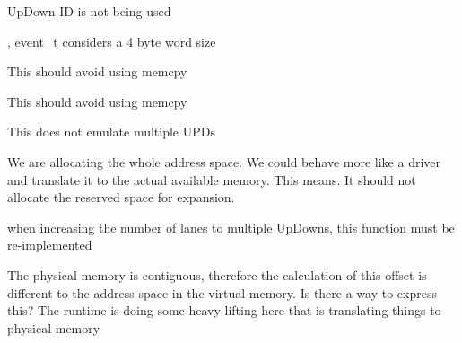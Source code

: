 
\begin{DoxyRefList}
\item[Class \mbox{\hyperlink{class_up_down_1_1event__t}{Up\+Down\+::event\+\_\+t}} ]\label{todo__todo000001}%
%
Up\+Down ID is not being used 



, \mbox{\hyperlink{class_up_down_1_1event__t}{event\+\_\+t}} considers a 4 byte word size  
\item[Member \mbox{\hyperlink{class_up_down_1_1operands__t_ab85237b737f780d3985be56eec5067ff}{Up\+Down\+::operands\+\_\+t\+::operands\+\_\+t}} (uint8\+\_\+t num, ptr\+\_\+t oper, word\+\_\+t cont=0)]\label{todo__todo000002}%
%
This should avoid using memcpy  
\item[Member \mbox{\hyperlink{class_up_down_1_1operands__t_a90604b735bc17d1136cbd32da1292496}{Up\+Down\+::operands\+\_\+t\+::operands\+\_\+t}} (uint8\+\_\+t num, word\+\_\+t cont=0)]\label{todo__todo000003}%
%
This should avoid using memcpy  
\item[Class \mbox{\hyperlink{class_up_down_1_1_sim_u_d_runtime__t}{Up\+Down\+::Sim\+UDRuntime\+\_\+t}} ]\label{todo__todo000006}%
%
This does not emulate multiple UPDs 
\item[Member \mbox{\hyperlink{class_up_down_1_1_sim_u_d_runtime__t_a7113c0fad105b40a81231139332c0061}{Up\+Down\+::Sim\+UDRuntime\+\_\+t\+::init\+Memory\+Arrays}} ()]\label{todo__todo000007}%
%
We are allocating the whole address space. We could behave more like a driver and translate it to the actual available memory. This means. It should not allocate the reserved space for expansion.  
\item[Member \mbox{\hyperlink{class_up_down_1_1_sim_u_d_runtime__t_a2963b2da2e6f38e395f45558cc98438c}{Up\+Down\+::Sim\+UDRuntime\+\_\+t\+::init\+Python\+Interface}} ()]\label{todo__todo000008}%
%
when increasing the number of lanes to multiple Up\+Downs, this function must be re-\/implemented  
\item[Member \mbox{\hyperlink{class_up_down_1_1_sim_u_d_runtime__t_a41f1e94eecd23017d26f2a7ad9fe1ce5}{Up\+Down\+::Sim\+UDRuntime\+\_\+t\+::t2ud\+\_\+memcpy}} (ptr\+\_\+t data, uint64\+\_\+t size, uint8\+\_\+t ud\+\_\+id, uint8\+\_\+t lane\+\_\+num, uint32\+\_\+t offset)]\label{todo__todo000009}%
%
The physical memory is contiguous, therefore the calculation of this offset is different to the address space in the virtual memory. Is there a way to express this? The runtime is doing some heavy lifting here that is translating things to physical memory  

\end{DoxyRefList}
